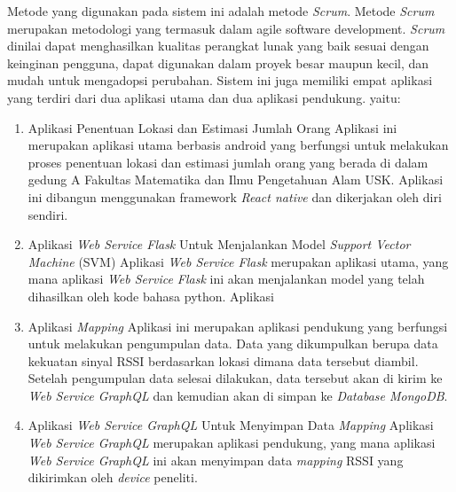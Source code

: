 Metode yang digunakan pada sistem ini adalah metode \textit{Scrum}. Metode \textit{Scrum} merupakan metodologi yang termasuk dalam agile software development. \textit{Scrum} dinilai dapat menghasilkan kualitas perangkat lunak yang baik sesuai dengan keinginan pengguna, dapat digunakan dalam proyek besar maupun kecil, dan mudah untuk mengadopsi perubahan. Sistem ini juga memiliki empat aplikasi yang terdiri dari dua aplikasi utama dan dua aplikasi pendukung. yaitu:
\begin{enumerate}
	\item Aplikasi Penentuan Lokasi dan Estimasi Jumlah Orang
	      \newline Aplikasi ini merupakan aplikasi utama berbasis android yang berfungsi untuk melakukan proses penentuan lokasi dan estimasi jumlah orang yang berada di dalam gedung A Fakultas Matematika dan Ilmu Pengetahuan Alam USK. Aplikasi ini dibangun menggunakan framework \textit{React native} dan dikerjakan oleh diri sendiri.

	\item Aplikasi \textit{Web Service Flask} Untuk Menjalankan Model \textit{Support Vector Machine} (SVM)
	      \newline Aplikasi \textit{Web Service Flask} merupakan aplikasi utama, yang mana aplikasi \textit{Web Service Flask} ini akan menjalankan model yang telah dihasilkan oleh kode bahasa python. Aplikasi

	\item Aplikasi \textit{Mapping}
	      \newline Aplikasi ini merupakan aplikasi pendukung yang berfungsi untuk melakukan pengumpulan data. Data yang dikumpulkan berupa data kekuatan sinyal RSSI berdasarkan lokasi dimana data tersebut diambil. Setelah pengumpulan data selesai dilakukan, data tersebut akan di kirim ke \textit{Web Service GraphQL} dan kemudian akan di simpan ke \textit{Database MongoDB}.

	\item Aplikasi \textit{Web Service GraphQL} Untuk Menyimpan Data \textit{Mapping}
	      \newline Aplikasi \textit{Web Service GraphQL} merupakan aplikasi pendukung, yang mana aplikasi \textit{Web Service GraphQL} ini akan menyimpan data \textit{mapping} RSSI yang dikirimkan oleh \textit{device} peneliti.

\end{enumerate}
